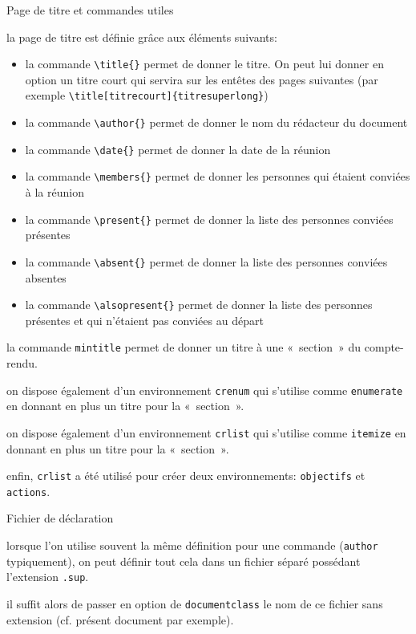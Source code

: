 \documentclass[fr,cr]{supaero-mins}
\begin{document}
\begin{crlist}{Page de titre et commandes utiles}
\item la page de titre est définie grâce aux éléments suivants:

  \begin{itemize}
  \item la commande \verb!\title{}! permet de donner le titre. On peut
    lui donner en option un titre court qui servira sur les entêtes
    des pages suivantes (par exemple
    \verb!\title[titrecourt]{titresuperlong}!)
  \item la commande \verb!\author{}! permet de donner le nom du
    rédacteur du document
  \item la commande \verb!\date{}! permet de donner la date de la
    réunion
  \item la commande \verb!\members{}! permet de donner les personnes
    qui étaient conviées à la réunion
  \item la commande \verb!\present{}! permet de donner la liste des
    personnes conviées présentes
  \item la commande \verb!\absent{}! permet de donner la liste des
    personnes conviées absentes
  \item la commande \verb!\alsopresent{}! permet de donner la liste
    des personnes présentes et qui n'étaient pas conviées au départ
  \end{itemize}

\item la commande \verb!mintitle! permet de donner un titre à une
  «~section~» du compte-rendu.
\item on dispose également d'un environnement \verb!crenum! qui
  s'utilise comme \verb!enumerate! en donnant en plus un titre pour la
  «~section~».
\item on dispose également d'un environnement \verb!crlist! qui
  s'utilise comme \verb!itemize! en donnant en plus un titre pour la
  «~section~».
\item enfin, \verb!crlist! a été utilisé pour créer deux
  environnements: \verb!objectifs! et \verb!actions!.
\end{crlist}

\begin{crlist}{Fichier de déclaration}
\item lorsque l'on utilise souvent la même définition pour une
  commande (\verb!author! typiquement), on peut définir tout cela dans
  un fichier séparé possédant l'extension \verb!.sup!.
\item il suffit alors de passer en option de \verb!documentclass! le
  nom de ce fichier sans extension (cf. présent document par exemple).
\end{crlist}
\end{document}
